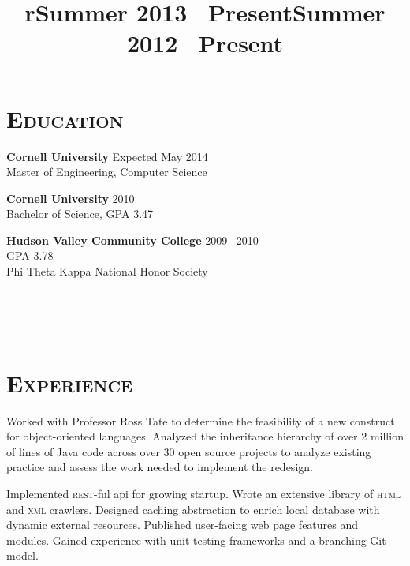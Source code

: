 \begin{resume}


\section{\textsc{Education}}

\textbf{Cornell University} \hfill Expected May 2014 \\
Master of Engineering, Computer Science

\textbf{Cornell University} \hfill 2010 \\
Bachelor of Science, GPA 3.47%

\textbf{Hudson Valley Community College} \hfill 2009 \textendash\ 2010 \\ 
GPA 3.78\\
Phi Theta Kappa National Honor Society


\begin{formatb}
  \title{r}\\
  \\
  \body\\
\end{formatb}

\vfill

\section{\textsc{Experience}}

\title{Summer 2013 \textendash \ Present}
\location{}
\begin{position}
Worked with Professor Ross Tate to determine the feasibility of a new construct for object-oriented languages.
Analyzed the inheritance hierarchy of over 2 million of lines of Java code across over 30 open source projects to analyze existing practice and assess the work needed to implement the redesign.
\end{position}

\title{Summer 2012 \textendash\ Present}
\location{}
\begin{position}
Implemented \textsc{rest-}ful api for growing startup.
Wrote an extensive library of \textsc{html} and \textsc{xml} crawlers.
Designed caching abstraction to enrich local database with dynamic external resources.
Published user-facing web page features and modules.
Gained experience with unit-testing frameworks and a branching Git model.
\end{position}


\end{resume}
